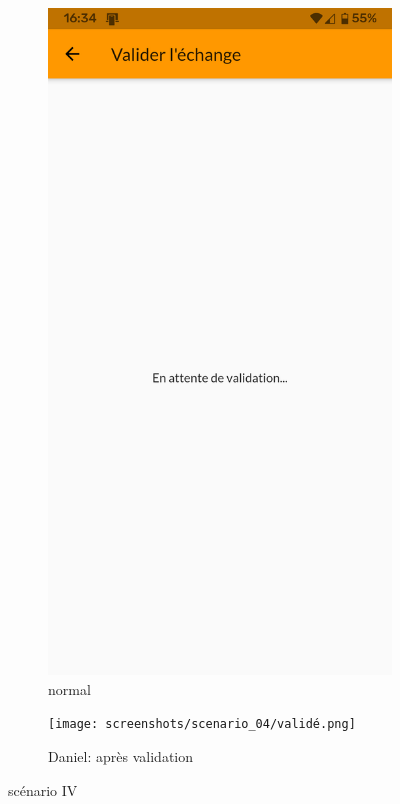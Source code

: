 \begin{figure}[!h]
\begin{subfigure}{.3\textwidth}
            \includegraphics[width=0.9\linewidth]{screenshots/scenario_04/en_attente_validation.png}
            \caption{normal}
            \label{fig:attente_validation}
        \end{subfigure}
        \begin{subfigure}{.3\textwidth}
            \centering
            \texttt{[image: screenshots/scenario\_04/validé.png]}
            \caption{Daniel: après validation}
            \label{fig:validé}
        \end{subfigure}
        \caption{scénario IV}
        \label{fig:scen04}
    \end{figure}

